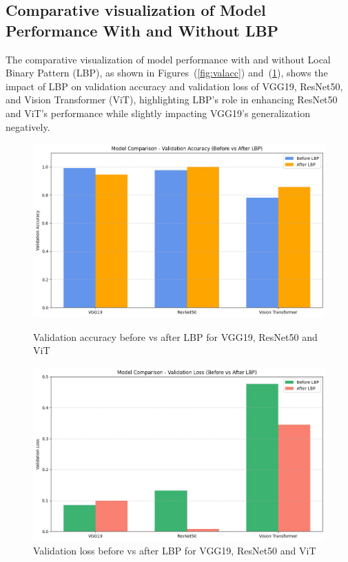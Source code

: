 \documentclass{ijclclp}
\begin{document}
\begin{flushleft}

  \subsection{Comparative visualization of Model Performance With and Without LBP}
  \vspace{1em}

   The comparative visualization of model performance with and without Local Binary Pattern (LBP), as shown in Figures~(\ref{fig:valacc}) and~(\ref{fig:valloss}), shows the impact of LBP on validation accuracy and validation loss of VGG19, ResNet50, and Vision Transformer (ViT), highlighting LBP’s role in enhancing ResNet50 and ViT’s performance while slightly impacting VGG19’s generalization negatively.
   \vspace{1em}

\begin{figure}[htbp]
    \centering
    \begin{minipage}[b]{0.48\textwidth}
    \includegraphics[width=\textwidth]{image21.png}
    \caption{Validation accuracy before vs after LBP for VGG19, ResNet50 and ViT}
    \label{fig:valacc}
    \end{minipage}
    \hfill
    \begin{minipage}[b]{0.48\textwidth}
    \includegraphics[width=\textwidth]{image22.png}
    \caption{Validation loss before vs after LBP for VGG19, ResNet50 and ViT}
    \label{fig:valloss}
    \end{minipage}
\end{figure}

\end{flushleft}
\end{document}

